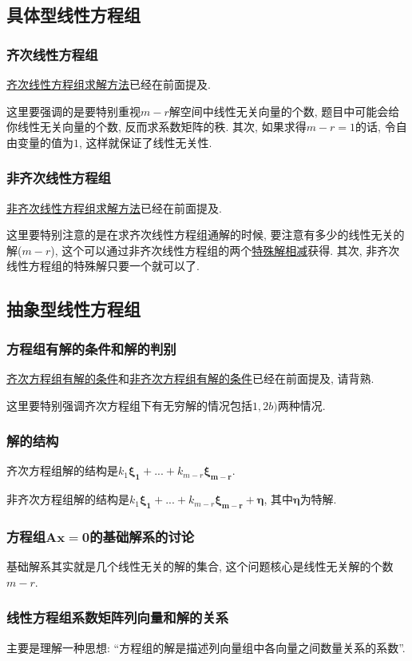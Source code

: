 \subsection{具体型线性方程组}
\subsubsection{齐次线性方程组}
\hyperref[齐次线性方程组求解方法]{齐次线性方程组求解方法}已经在前面提及.\par  这里要强调的是要特别重视$ m-r $解空间中线性无关向量的个数, 题目中可能会给你线性无关向量的个数, 反而求系数矩阵的秩. 其次, 如果求得$ m-r=1 $的话, 令自由变量的值为$ 1 $, 这样就保证了线性无关性.
\subsubsection{非齐次线性方程组}
\hyperref[非齐次线性方程组求解方法]{非齐次线性方程组求解方法}已经在前面提及.\par  这里要特别注意的是在求齐次线性方程组通解的时候, 要注意有多少的线性无关的解($ m-r $), 这个可以通过非齐次线性方程组的两个\hyperref[特殊解相减]{特殊解相减}获得. 其次, 非齐次线性方程组的特殊解只要一个就可以了.
\subsection{抽象型线性方程组}
\subsubsection{方程组有解的条件和解的判别}
\hyperref[齐次方程组有解的条件]{齐次方程组有解的条件}和\hyperref[非齐次方程组有解的条件]{非齐次方程组有解的条件}已经在前面提及, 请背熟.\par
这里要特别强调齐次方程组下有无穷解的情况包括$ 1,2b) $两种情况.
\subsubsection{解的结构}
齐次方程组解的结构是$ k_{1}\bm{\xi_{1}}+...+k_{m-r}\bm{\xi_{m-r}}. $ \par
非齐次方程组解的结构是$ k_{1}\bm{\xi_{1}}+...+k_{m-r}\bm{\xi_{m-r}}+\bm{\eta} $, 其中$ \bm{\eta} $为特解.
\subsubsection{方程组$ \bm{A}\bm{x}=\bm{0} $的基础解系的讨论}
基础解系其实就是几个线性无关的解的集合, 这个问题核心是线性无关解的个数$ m-r $.
\subsubsection{线性方程组系数矩阵列向量和解的关系}
主要是理解一种思想: ``方程组的解是描述列向量组中各向量之间数量关系的系数''.
